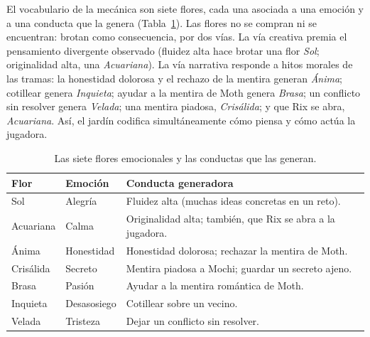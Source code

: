\documentclass[12pt,twoside,titlepage]{report}
\begin{document}
El vocabulario de la mecánica son siete flores, cada una asociada a una emoción y a una conducta que la genera (Tabla~\ref{tab:flores}). Las flores no se compran ni se encuentran: brotan como consecuencia, por dos vías. La vía creativa premia el pensamiento divergente observado (fluidez alta hace brotar una flor \textit{Sol}; originalidad alta, una \textit{Acuariana}). La vía narrativa responde a hitos morales de las tramas: la honestidad dolorosa y el rechazo de la mentira generan \textit{Ánima}; cotillear genera \textit{Inquieta}; ayudar a la mentira de Moth genera \textit{Brasa}; un conflicto sin resolver genera \textit{Velada}; una mentira piadosa, \textit{Crisálida}; y que Rix se abra, \textit{Acuariana}. Así, el jardín codifica simultáneamente cómo piensa y cómo actúa la jugadora.

\begin{table}[h]
  \centering
  \caption{Las siete flores emocionales y las conductas que las generan.}
  \label{tab:flores}
  \begin{footnotesize}
  \renewcommand{\arraystretch}{1.3}
  \begin{tabular}{p{2.4cm}p{2.6cm}p{7.6cm}}
    \hline
    \textbf{Flor} & \textbf{Emoción} & \textbf{Conducta generadora} \\
    \hline
    Sol & Alegría & Fluidez alta (muchas ideas concretas en un reto). \\
    \hline
    Acuariana & Calma & Originalidad alta; también, que Rix se abra a la jugadora. \\
    \hline
    Ánima & Honestidad & Honestidad dolorosa; rechazar la mentira de Moth. \\
    \hline
    Crisálida & Secreto & Mentira piadosa a Mochi; guardar un secreto ajeno. \\
    \hline
    Brasa & Pasión & Ayudar a la mentira romántica de Moth. \\
    \hline
    Inquieta & Desasosiego & Cotillear sobre un vecino. \\
    \hline
    Velada & Tristeza & Dejar un conflicto sin resolver. \\
    \hline
  \end{tabular}
  \end{footnotesize}
\end{table}
\end{document}

